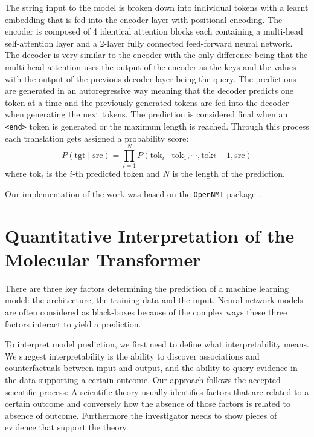 The string input to the model is broken down into individual tokens with a learnt embedding that is fed into the encoder layer with positional encoding. The encoder is composed of 4 identical attention blocks each containing a multi-head self-attention layer and a 2-layer fully connected feed-forward neural network. The decoder is very similar to the encoder with the only difference being that the multi-head attention uses the output of the encoder as the keys and the values with the output of the previous decoder layer being the query. The predictions are generated in an autoregressive way meaning that the decoder predicts one token at a time and the previously generated tokens are fed into the decoder when generating the next tokens. The prediction is considered final when an \texttt{<end>} token is generated or the maximum length is reached. Through this process each translation gets assigned a probability score:
\begin{equation}
    P(\textrm{tgt} \mid \textrm{src}) = \prod_{i=1}^N P(\textrm{tok}_i \mid \textrm{tok}_1, \cdots , \textrm{tok}{i-1}, \textrm{src}) 
\end{equation}
where $\textrm{tok}_i$ is the $i$-th predicted token and $N$ is the length of the prediction.

Our implementation of the work was based on the \texttt{OpenNMT} package \cite{Klein2017}.

\section*{Quantitative Interpretation of the Molecular Transformer}
There are three key factors determining the prediction of a machine learning model: the architecture, the training data and the input. Neural network models are often considered as black-boxes because of the complex ways these three factors interact to yield a prediction. 

To interpret model prediction, we first need to define what interpretability means. We suggest interpretability is the ability to discover associations and counterfactuals between input and output, and the ability to query evidence in the data supporting a certain outcome. Our approach follows the accepted scientific process: A scientific theory usually identifies factors that are related to a certain outcome and conversely how the absence of those factors is related to absence of outcome. Furthermore the investigator needs to show pieces of evidence that support the theory.

